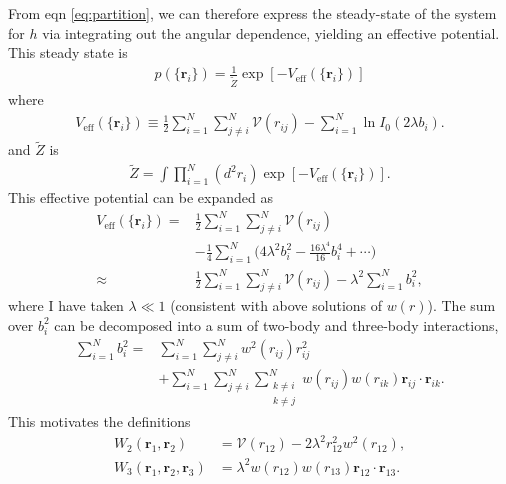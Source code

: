 \documentclass[twocolumn,amsmath,amssymb,aps]{revtex4-1}%
\begin{document}
From eqn \ref{eq:partition}, we can therefore express the steady-state of
the system for $h$ via integrating out the angular dependence, yielding an
effective potential. This steady state is
\begin{align}
  p(\{\bm{r}_i\})=\frac{1}{\tilde{Z}}\exp[-V_{\mathrm{eff}}
  (\{\bm{r}_i\})]
\end{align}
where
\begin{align}
  V_{\mathrm{eff}}(\{\bm{r}_i\})
  \equiv\frac{1}{2}\sum_{i=1}^N\sum_{j\neq i}^N
  \mathcal{V}(r_{ij})-\sum_{i=1}^N\ln I_0(2\lambda b_i).
\end{align}
and $\tilde{Z}$ is 
\begin{align}
  \tilde{Z}=\int\prod_{i=1}^N(d^2r_i)\exp[-V_{\mathrm{eff}}(\{\bm{r}_i\})].
\end{align}
This effective potential can be expanded as
\begin{align}
  V_{\mathrm{eff}}(\{\bm{r}_i\})
  =&\frac{1}{2}\sum_{i=1}^N\sum_{j\neq i}^N\mathcal{V}(r_{ij})\nonumber\\
   &-\frac{1}{4}\sum_{i=1}^N\bigg(4\lambda^2b_i^2
     -\frac{16\lambda^4}{16}b_i^4+\cdots\bigg)
     \nonumber\\
  \approx
   &\frac{1}{2}\sum_{i=1}^N\sum_{j\neq i}^N\mathcal{V}(r_{ij})
     -\lambda^2\sum_{i=1}^Nb_i^2,
\end{align}
where I have taken $\lambda\ll 1$ (consistent with above solutions of
$w(r)$). The sum over $b_i^2$ can be decomposed into a sum of two-body and
three-body interactions,
\begin{align}
  \sum_{i=1}^Nb_i^2
  =&\sum_{i=1}^N\sum_{j\neq i}^Nw^2(r_{ij})r_{ij}^2\nonumber\\
   &+\sum_{i=1}^N\sum_{j\neq i}^N\sum_{\substack{k\neq i \\ k\neq j}}^N
  w(r_{ij})w(r_{ik})\bm{r}_{ij}\cdot\bm{r}_{ik}.
\end{align}
This motivates the definitions
\begin{subequations}
  \label{eqs:2and3body}
  \begin{align}
    W_2(\bm{r}_1,\bm{r}_2)
    &= \mathcal{V}(r_{12})
      -2\lambda^2 r_{12}^2w^2(r_{12}),\label{eq:2body}\\
    W_3(\bm{r}_1,\bm{r}_2,\bm{r}_3)
    &= \lambda^2w(r_{12})w(r_{13})\bm{r}_{12}\cdot\bm{r}_{13}.
      \label{eq:3body}
  \end{align}
\end{subequations}

  

\end{document}
